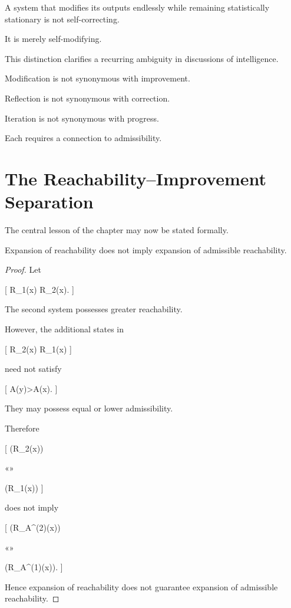 \documentclass[11pt,oneside,openany]{book}
\newcommand{\Vol}{\operatorname{Vol}} \newcommand{\dist}{\operatorname{dist}}
\begin{document}
A system that modifies its outputs endlessly while remaining statistically stationary is not self-correcting.

It is merely self-modifying.

This distinction clarifies a recurring ambiguity in discussions of intelligence.

Modification is not synonymous with improvement.

Reflection is not synonymous with correction.

Iteration is not synonymous with progress.

Each requires a connection to admissibility.

\section{The Reachability--Improvement Separation}

The central lesson of the chapter may now be stated formally.

\begin{theorem}

Expansion of reachability does not imply expansion of admissible reachability.

\end{theorem}

\begin{proof}

Let

[
R_1(x)
\subset
R_2(x).
]

The second system possesses greater reachability.

However, the additional states in

[
R_2(x)
\setminus
R_1(x)
]

need not satisfy

[
A(y)>A(x).
]

They may possess equal or lower admissibility.

Therefore

[
\Vol(R_2(x))

«»

\Vol(R_1(x))
]

does not imply

[
\Vol(R_A^{(2)}(x))

«»

\Vol(R_A^{(1)}(x)).
]

Hence expansion of reachability does not guarantee expansion of admissible reachability.

\end{proof}
\end{document}
